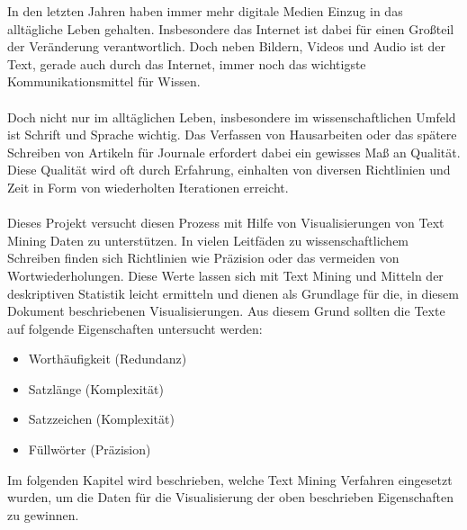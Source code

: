

\maketitle

In den letzten Jahren haben immer mehr digitale Medien Einzug in das allt\"agliche Leben gehalten. Insbesondere das Internet ist dabei f\"ur einen Großteil der Ver\"anderung verantwortlich. Doch neben Bildern, Videos und Audio ist der Text, gerade auch durch das Internet, immer noch das wichtigste Kommunikationsmittel f\"ur Wissen.\\
\\
Doch nicht nur im allt\"aglichen Leben, insbesondere im wissenschaftlichen Umfeld ist Schrift und Sprache wichtig. Das Verfassen von Hausarbeiten oder das sp\"atere Schreiben von Artikeln f\"ur Journale erfordert dabei ein gewisses Maß an Qualit\"at. Diese Qualit\"at wird oft durch Erfahrung, einhalten von diversen Richtlinien und Zeit in Form von wiederholten Iterationen erreicht.\\
\\
Dieses Projekt versucht diesen Prozess mit Hilfe von Visualisierungen von Text Mining Daten zu unterst\"utzen. In vielen Leitf\"aden zu wissenschaftlichem Schreiben finden sich Richtlinien wie Pr\"azision oder das vermeiden von Wortwiederholungen. Diese Werte lassen sich mit Text Mining und Mitteln der deskriptiven Statistik leicht ermitteln und dienen als Grundlage f\"ur die, in diesem Dokument beschriebenen Visualisierungen. Aus diesem Grund sollten die Texte auf folgende Eigenschaften untersucht werden:\\
\begin{itemize}
\item Worth\"aufigkeit (Redundanz)
\item Satzl\"ange (Komplexit\"at)
\item Satzzeichen (Komplexit\"at)
\item F\"ullw\"orter (Pr\"azision)
\end{itemize}
Im folgenden Kapitel wird beschrieben, welche Text Mining Verfahren eingesetzt wurden, um die Daten für die Visualisierung der oben beschrieben Eigenschaften zu gewinnen.
